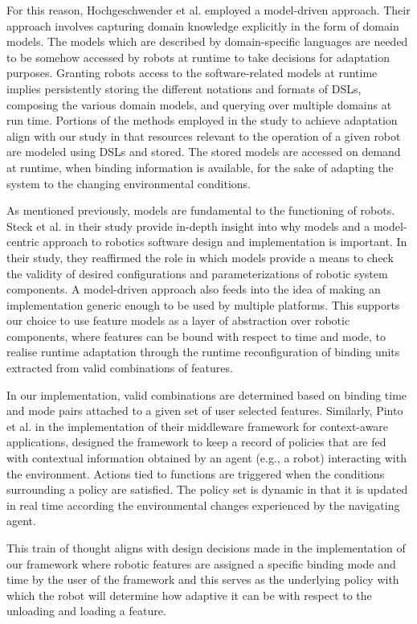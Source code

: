 \documentclass[conference]{IEEEtran}
\begin{document}
For this reason, Hochgeschwender et al. \cite{graph-mde} employed a model-driven approach. Their approach involves capturing domain knowledge explicitly in the form of domain models. The models which are described by domain-specific languages are needed to be somehow accessed by robots at runtime to take decisions for adaptation purposes. Granting robots access to the software-related models at runtime implies persistently storing the different notations and formats of DSLs, composing the various domain models, and querying over multiple domains at run time. Portions of the methods employed in the study to achieve adaptation align with our study in that resources relevant to the operation of a given robot are modeled using DSLs and stored. The stored models are accessed on demand at runtime, when binding information is available, for the sake of adapting the system to the changing environmental conditions.

As mentioned previously, models are fundamental to the functioning of robots. Steck et al. \cite{model-centric} in their study provide in-depth insight into why models and a model-centric approach to robotics software design and implementation is important.
In their study, they reaffirmed the role in which models provide a means to check the validity of desired configurations and parameterizations of robotic system components. A model-driven approach also feeds into the idea of making an implementation generic enough to be used by multiple platforms. This supports our choice to use feature models as a layer of abstraction over robotic components, where features can be bound with respect to time and mode, to realise runtime adaptation through the runtime reconfiguration of binding units extracted from valid combinations of features.

 In our implementation, valid combinations are determined based on binding time and mode pairs attached to a given set of user selected features. Similarly, Pinto et al. \cite{cont-aware} in the implementation of their middleware framework for context-aware applications, designed the framework to keep a record of policies that are fed with contextual information obtained by an agent (e.g., a robot) interacting with the environment. Actions tied to functions are triggered when the conditions surrounding a policy are satisfied. The policy set is dynamic in that it is updated in real time according the environmental changes experienced by the navigating agent.
 
 This train of thought aligns with design decisions made in the implementation of our framework where robotic features are assigned a specific binding mode and time by the user of the framework and this serves as the underlying policy with which the robot will determine how adaptive it can be with respect to the unloading and loading a feature.
 
\end{document}
